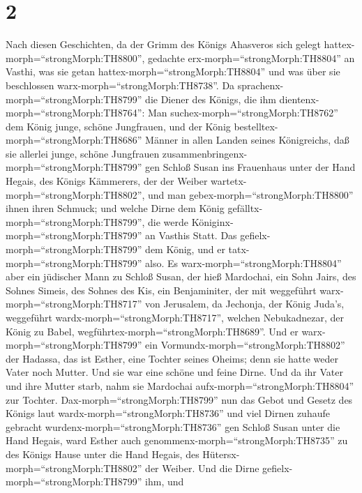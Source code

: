\hypertarget{section-1}{%
\section{2}\label{section-1}}

 Nach diesen Geschichten, da der Grimm des Königs Ahasveros
sich gelegt hattex-morph=``strongMorph:TH8800'', gedachte
erx-morph=``strongMorph:TH8804'' an Vasthi, was sie getan
hattex-morph=``strongMorph:TH8804'' und was über sie beschlossen
warx-morph=``strongMorph:TH8738''.  Da
sprachenx-morph=``strongMorph:TH8799'' die Diener des Königs, die ihm
dientenx-morph=``strongMorph:TH8764'': Man
suchex-morph=``strongMorph:TH8762'' dem König junge, schöne Jungfrauen,
 und der König bestelltex-morph=``strongMorph:TH8686''
Männer in allen Landen seines Königreichs, daß sie allerlei junge,
schöne Jungfrauen zusammenbringenx-morph=``strongMorph:TH8799'' gen
Schloß Susan ins Frauenhaus unter der Hand Hegais, des Königs Kämmerers,
der der Weiber wartetx-morph=``strongMorph:TH8802'', und man
gebex-morph=``strongMorph:TH8800'' ihnen ihren Schmuck;  und
welche Dirne dem König gefälltx-morph=``strongMorph:TH8799'', die werde
Königinx-morph=``strongMorph:TH8799'' an Vasthis Statt. Das
gefielx-morph=``strongMorph:TH8799'' dem König, und er
tatx-morph=``strongMorph:TH8799'' also.  Es
warx-morph=``strongMorph:TH8804'' aber ein jüdischer Mann zu Schloß
Susan, der hieß Mardochai, ein Sohn Jairs, des Sohnes Simeis, des Sohnes
des Kis, ein Benjaminiter,  der mit weggeführt
warx-morph=``strongMorph:TH8717'' von Jerusalem, da Jechonja, der König
Juda's, weggeführt wardx-morph=``strongMorph:TH8717'', welchen
Nebukadnezar, der König zu Babel,
wegführtex-morph=``strongMorph:TH8689''.  Und er
warx-morph=``strongMorph:TH8799'' ein
Vormundx-morph=``strongMorph:TH8802'' der Hadassa, das ist Esther, eine
Tochter seines Oheims; denn sie hatte weder Vater noch Mutter. Und sie
war eine schöne und feine Dirne. Und da ihr Vater und ihre Mutter starb,
nahm sie Mardochai aufx-morph=``strongMorph:TH8804'' zur Tochter.
 Dax-morph=``strongMorph:TH8799'' nun das Gebot und Gesetz
des Königs laut wardx-morph=``strongMorph:TH8736'' und viel Dirnen
zuhaufe gebracht wurdenx-morph=``strongMorph:TH8736'' gen Schloß Susan
unter die Hand Hegais, ward Esther auch
genommenx-morph=``strongMorph:TH8735'' zu des Königs Hause unter die
Hand Hegais, des Hütersx-morph=``strongMorph:TH8802'' der Weiber.
 Und die Dirne gefielx-morph=``strongMorph:TH8799'' ihm, und
